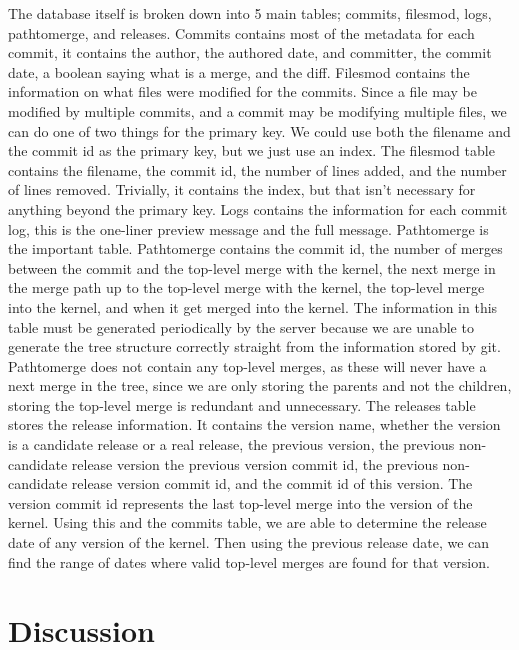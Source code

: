 \documentclass[conference, draftclsnofoot]{IEEEtran}
\begin{document}
The database itself is broken down into 5 main tables; commits, filesmod, logs,
pathtomerge, and releases. Commits contains most of the metadata for each
commit, it contains the author, the authored date, and committer, the commit
date, a boolean saying what is a merge, and the diff. Filesmod contains the
information on what files were modified for the commits. Since a file may be
modified by multiple commits, and a commit may be modifying multiple files, we
can do one of two things for the primary key. We could use both the filename
and the commit id as the primary key, but we just use an index. The filesmod
table contains the filename, the commit id, the number of lines added, and the
number of lines removed. Trivially, it contains the index, but that isn't
necessary for anything beyond the primary key. Logs contains the information
for each commit log, this is the one-liner preview message and the full
message. Pathtomerge is the important table. Pathtomerge contains the commit
id, the number of merges between the commit and the top-level merge with the
kernel, the next merge in the merge path up to the top-level merge with the
kernel, the top-level merge into the kernel, and when it get merged into the
kernel. The information in this table must be generated periodically by the
server because we are unable to generate the tree structure correctly straight
from the information stored by git. Pathtomerge does not contain any top-level
merges, as these will never have a next merge in the tree, since we are only
storing the parents and not the children, storing the top-level merge is
redundant and unnecessary. The releases table stores the release information.
It contains the version name, whether the version is a candidate release or a
real release, the previous version, the previous non-candidate release version
the previous version commit id, the previous non-candidate release version
commit id, and the commit id of this version. The version commit id represents
the last top-level merge into the version of the kernel. Using this and the
commits table, we are able to determine the release date of any version of the
kernel. Then using the previous release date, we can find the range of dates
where valid top-level merges are found for that version.


\section{Discussion}
\end{document}
